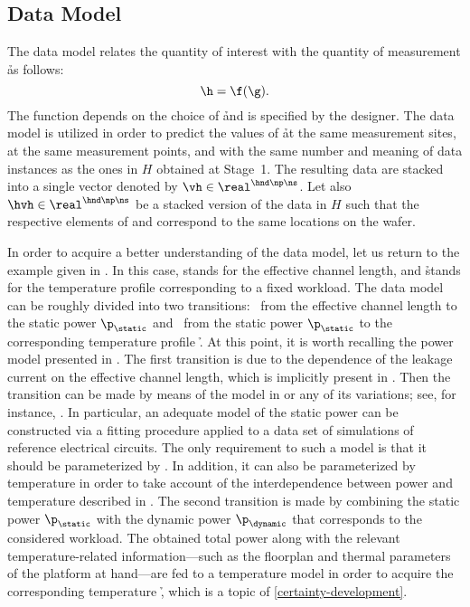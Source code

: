\subsection{Data Model}

The data model relates the quantity of interest \g with the quantity of
measurement \h as follows:
\[
  \h = \f(\g).
\]
The function \f depends on the choice of \h and is specified by the designer.
The data model is utilized in order to predict the values of \h at the same
measurement sites, at the same measurement points, and with the same number and
meaning of data instances as the ones in $H$ obtained at Stage~1. The resulting
data are stacked into a single vector denoted by $\vh \in \real^{\hnd \np \ns}$.
Let also $\hvh \in \real^{\hnd \np \ns}$ be a stacked version of the data in $H$
such that the respective elements of \vh and \hvh correspond to the same
locations on the wafer.

In order to acquire a better understanding of the data model, let us return to
the example given in . In this case, \g stands for the
effective channel length, and \h stands for the temperature profile \mq
corresponding to a fixed workload. The data model can be roughly divided into
two transitions: \one~from the effective channel length \g to the static power
$\p_\static$ and \two~from the static power $\p_\static$ to the corresponding
temperature profile \h. At this point, it is worth recalling the power model
presented in . The first transition is due to the dependence
of the leakage current on the effective channel length, which is implicitly
present in . Then the transition can be made by means of the
model in  or any of its variations; see, for instance,
\cite{chandrakasan2000, srivastava2010, juan2012}. In particular, an adequate
model of the static power can be constructed via a fitting procedure applied to
a data set of  simulations of reference electrical circuits. The only
requirement to such a model is that it should be parameterized by \g. In
addition, it can also be parameterized by temperature in order to take account
of the interdependence between power and temperature described in
. The second transition is made by combining the static power
$\p_\static$ with the dynamic power $\p_\dynamic$ that corresponds to the
considered workload. The obtained total power along with the relevant
temperature-related information---such as the floorplan and thermal parameters
of the platform at hand---are fed to a temperature model in order to acquire the
corresponding temperature \h, which is a topic of \cref{certainty-development}.

